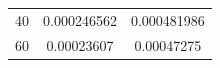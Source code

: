 \documentclass{jreport}		%
\begin{document}
\begin{table}
\begin{center}
\begin{tabular}{c|cc}
40&0.000246562&0.000481986 \\
60&0.00023607&0.00047275 \\

\end{tabular}
\end{center}
\end{table}
\end{document}
